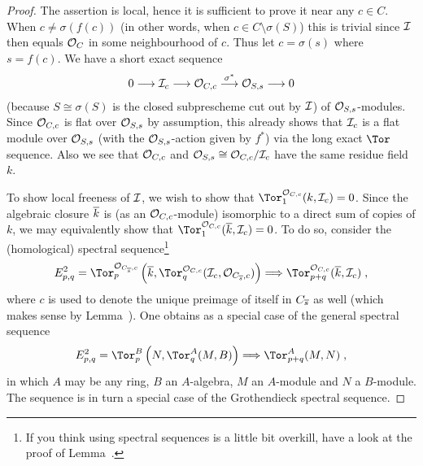\documentclass[a4paper,parskip=half,numbers=enddot, DIV=12]{scrreprt}
\begin{document}
\begin{proof}
	The assertion is local, hence it is sufficient to prove it near any $c\in C$. When $c\neq \sigma(f(c))$ (in other words, when $c\in C\setminus \sigma(S)$) this is trivial since $\mathcal{I}$ then equals $\mathcal{O}_C$ in some neighbourhood of $c$. Thus let $c=\sigma(s)$ where $s=f(c)$. We have a short exact sequence
	\begin{align}\lbl{eq:s(S)closedSES}
		0\morphism \Ii_c\morphism \Oo_{C,c}\morphism[\sigma^*]\Oo_{S,s}\morphism 0
	\end{align}
	(because $S\cong \sigma(S)$ is the closed subprescheme cut out by $\mathcal{I}$) of $\mathcal{O}_{S,s}$-modules. Since $\mathcal{O}_{C,c}$ is flat over $\mathcal{O}_{S,s}$ by assumption, this already shows that $\mathcal{I}_c$ is a flat module over $\mathcal{O}_{S,s}$ (with the $\mathcal{O}_{S,s}$-action given by $f^*$) via the long exact $\Tor$ sequence. Also we see that $\mathcal{O}_{C,c}$ and $\mathcal{O}_{S,s}\cong \mathcal{O}_{C,c}/\mathcal{I}_c$ have the same residue field $k$.
	
	To show local freeness of $\mathcal{I}$, we wish to show that $\Tor_1^{\Oo_{C,c}}(k,\Ii_c)=0$. Since the algebraic closure $\overline{k}$ is (as an $\mathcal{O}_{C,c}$-module) isomorphic to a direct sum of copies of $k$, we may equivalently show that $\Tor_1^{\Oo_{C,c}}(\ov{k},\Ii_c)=0$. To do so, consider the (homological) spectral sequence\footnote{If you think using spectral sequences is a little bit overkill, have a look at the proof of Lemma~.}
	\begin{align}\lbl{eq:TorSS1}
		E_{p,q}^2=\Tor_p^{\Oo_{C_{\ov{s}},c}}\left(\ov{k},\Tor_q^{\Oo_{C,c}}(\Ii_c,\Oo_{C_{\ov{s}},c})\right)\converge\Tor_{p+q}^{\Oo_{C,c}}(\ov{k},\Ii_c)\;,
	\end{align}
	where $c$ is used to denote the unique preimage of itself in $C_{\overline{s}}$ as well (which makes sense by Lemma~).	One obtains  as a special case of the general spectral sequence
	\begin{align}\lbl{eq:TorGrothendieckSS}
		E_{p,q}^2=\Tor_p^B\left(N,\Tor_q^A(M,B)\right)\converge\Tor_{p+q}^A(M,N)\;,
	\end{align}
	in which $A$ may be any ring, $B$ an $A$-algebra, $M$ an $A$-module and $N$ a $B$-module. The sequence  is in turn a special case of the Grothendieck spectral sequence. 
	

\end{proof}
\end{document}
